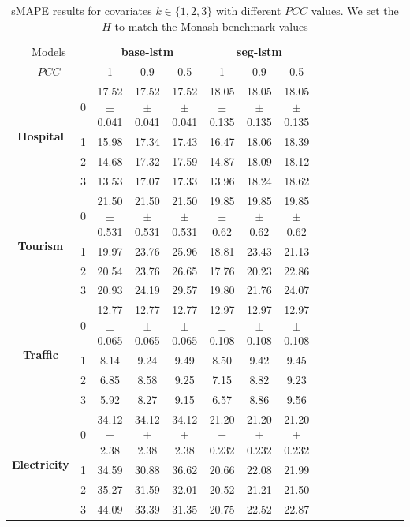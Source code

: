 \documentclass{article}
\newcommand{\horizon}{H}
\newcommand{\pearson}{PCC}
\begin{document}
\begin{table}[tbp]
  \caption{sMAPE results for covariates $k \in \{1, 2, 3\}$ with different $\pearson$ values. We set the $\horizon$ to match the Monash benchmark values }
  \centering
  \begin{threeparttable}
  \begin{small}
  \renewcommand{\multirowsetup}{\centering}
  \setlength{\tabcolsep}{2.6pt}
  \begin{tabular}{c|c|cccccccccccccc}
    \toprule
    \multicolumn{2}{c}{Models} & \multicolumn{3}{c}{\textbf{base-lstm}} & \multicolumn{3}{c}{\textbf{seg-lstm}} \\
    \cmidrule(lr){3-5} \cmidrule(lr){6-8}
    \multicolumn{2}{c}{$\pearson$} & 1 & 0.9 & 0.5 & 1 & 0.9 & 0.5 \\
    \toprule
    \multirow{4}{*}{\textbf{Hospital}} & 0 & 17.52 $\pm$ 0.041 & 17.52 $\pm$ 0.041 & 17.52 $\pm$ 0.041 & 18.05 $\pm$ 0.135 & 18.05 $\pm$ 0.135 & 18.05 $\pm$ 0.135 \\
    & 1 & 15.98 & 17.34 & 17.43 & 16.47 & 18.06 & 18.39 \\
    & 2 & 14.68 & 17.32 & 17.59 & 14.87 & 18.09 & 18.12 \\
    & 3 & 13.53 & 17.07 & 17.33 & 13.96 & 18.24 & 18.62 \\
    \midrule
    \multirow{4}{*}{\textbf{Tourism}} & 0 & 21.50 $\pm$ 0.531 & 21.50 $\pm$ 0.531 & 21.50 $\pm$ 0.531 & 19.85 $\pm$ 0.62 & 19.85 $\pm$ 0.62 & 19.85 $\pm$ 0.62 \\
    & 1 & 19.97 & 23.76 & 25.96 & 18.81 & 23.43 & 21.13 \\
    & 2 & 20.54 & 23.76 & 26.65 & 17.76 & 20.23 & 22.86 \\
    & 3 & 20.93 & 24.19 & 29.57 & 19.80 & 21.76 & 24.07 \\
    \midrule
    \multirow{4}{*}{\textbf{Traffic}} & 0 & 12.77 $\pm$ 0.065 & 12.77 $\pm$ 0.065 & 12.77 $\pm$ 0.065 & 12.97 $\pm$ 0.108 & 12.97 $\pm$ 0.108 & 12.97 $\pm$ 0.108 \\
    & 1 & 8.14 & 9.24 & 9.49 & 8.50 & 9.42 & 9.45 \\
    & 2 & 6.85 & 8.58 & 9.25 & 7.15 & 8.82 & 9.23 \\
    & 3 & 5.92 & 8.27 & 9.15 & 6.57 & 8.86 & 9.56 \\
    \midrule
    \multirow{4}{*}{\textbf{Electricity}} & 0 & 34.12 $\pm$ 2.38 & 34.12 $\pm$ 2.38 & 34.12 $\pm$ 2.38 & 21.20 $\pm$ 0.232 & 21.20 $\pm$ 0.232 & 21.20 $\pm$ 0.232 \\
    & 1 & 34.59 & 30.88 & 36.62 & 20.66 & 22.08 & 21.99 \\
    & 2 & 35.27 & 31.59 & 32.01 & 20.52 & 21.21 & 21.50 \\
    & 3 & 44.09 & 33.39 & 31.35 & 20.75 & 22.52 & 22.87 \\
    \bottomrule
  \end{tabular}
  \end{small}
  \end{threeparttable}
  \label{tab:covariate_results}
  \vspace{-15pt}
\end{table}
\end{document}
